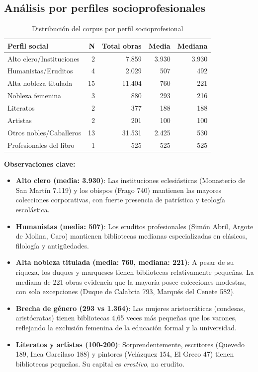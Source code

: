 \documentclass[12pt,a4paper]{article}
\begin{document}
\subsection{Análisis por perfiles socioprofesionales}

\begin{table}[h]
\centering
\begin{tabular}{lrrrr}
\toprule
\textbf{Perfil social} & \textbf{N} & \textbf{Total obras} & \textbf{Media} & \textbf{Mediana} \\
\midrule
\rowcolor{yellow!20}
Alto clero/Instituciones & 2 & 7.859 & 3.930 & 3.930 \\
\rowcolor{yellow!20}
Humanistas/Eruditos & 4 & 2.029 & 507 & 492 \\
\rowcolor{green!20}
Alta nobleza titulada & 15 & 11.404 & 760 & 221 \\
Nobleza femenina & 3 & 880 & 293 & 216 \\
Literatos & 2 & 377 & 188 & 188 \\
Artistas & 2 & 201 & 100 & 100 \\
Otros nobles/Caballeros & 13 & 31.531 & 2.425 & 530 \\
Profesionales del libro & 1 & 525 & 525 & 525 \\
\bottomrule
\end{tabular}
\caption{Distribución del corpus por perfil socioprofesional}
\end{table}

\textbf{Observaciones clave:}

\begin{itemize}
\item \textbf{Alto clero (media: 3.930)}: Las instituciones eclesiásticas (Monasterio de San Martín 7.119) y los obispos (Frago 740) mantienen las mayores colecciones corporativas, con fuerte presencia de patrística y teología escolástica.

\item \textbf{Humanistas (media: 507)}: Los eruditos profesionales (Simón Abril, Argote de Molina, Caro) mantienen bibliotecas medianas especializadas en clásicos, filología y antigüedades.

\item \textbf{Alta nobleza titulada (media: 760, mediana: 221)}: A pesar de su riqueza, los duques y marqueses tienen bibliotecas relativamente pequeñas. La mediana de 221 obras evidencia que la mayoría posee colecciones modestas, con solo excepciones (Duque de Calabria 793, Marqués del Cenete 582).

\item \textbf{Brecha de género (293 vs 1.364)}: Las mujeres aristocráticas (condesas, aristócratas) tienen bibliotecas 4,65 veces más pequeñas que los varones, reflejando la exclusión femenina de la educación formal y la universidad.

\item \textbf{Literatos y artistas (100-200)}: Sorprendentemente, escritores (Quevedo 189, Inca Garcilaso 188) y pintores (Velázquez 154, El Greco 47) tienen bibliotecas pequeñas. Su capital es \textit{creativo}, no erudito.
\end{itemize}
\end{document}
